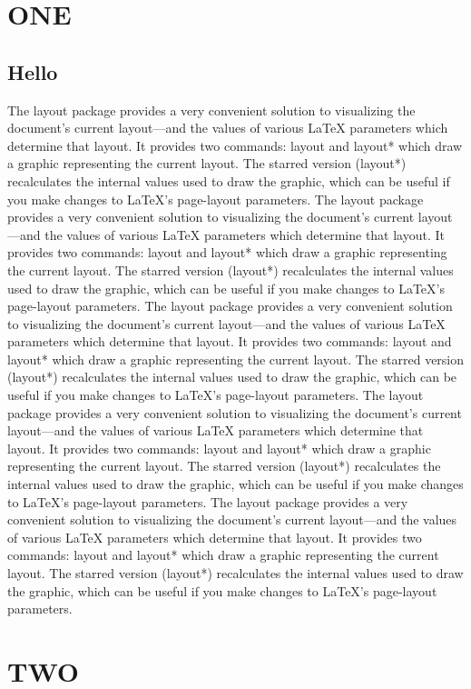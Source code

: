 \documentclass{bduMasters}
\begin{document}
\tableofcontents
\chapter{ONE}
\section{Hello}
The layout package provides a very convenient solution to visualizing the document's current layout—and the values of various LaTeX parameters which determine that layout. It provides two commands: layout and layout* which draw a graphic representing the current layout. The starred version (layout*) recalculates the internal values used to draw the graphic, which can be useful if you make changes to LaTeX's page-layout parameters.
The layout package provides a very convenient solution to visualizing the document's current layout—and the values of various LaTeX parameters which determine that layout. It provides two commands: layout and layout* which draw a graphic representing the current layout. The starred version (layout*) recalculates the internal values used to draw the graphic, which can be useful if you make changes to LaTeX's page-layout parameters.
The layout package provides a very convenient solution to visualizing the document's current layout—and the values of various LaTeX parameters which determine that layout. It provides two commands: layout and layout* which draw a graphic representing the current layout. The starred version (layout*) recalculates the internal values used to draw the graphic, which can be useful if you make changes to LaTeX's page-layout parameters.
The layout package provides a very convenient solution to visualizing the document's current layout—and the values of various LaTeX parameters which determine that layout. It provides two commands: layout and layout* which draw a graphic representing the current layout. The starred version (layout*) recalculates the internal values used to draw the graphic, which can be useful if you make changes to LaTeX's page-layout parameters.
The layout package provides a very convenient solution to visualizing the document's current layout—and the values of various LaTeX parameters which determine that layout. It provides two commands: layout and layout* which draw a graphic representing the current layout. The starred version (layout*) recalculates the internal values used to draw the graphic, which can be useful if you make changes to LaTeX's page-layout parameters.

\chapter{TWO}
\end{document}
